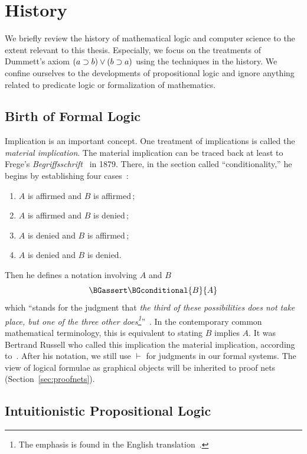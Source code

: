 \section{History}

We briefly review the history of mathematical logic and computer science
to the extent relevant to this thesis.
Especially, we focus on the treatments of Dummett's axiom $(a\supset
b)\lor(b\supset a)$ using the techniques in the history.
We confine ourselves to the developments of propositional logic and
ignore anything related to predicate logic or formalization of
mathematics.

\subsection{Birth of Formal Logic}

Implication is an important concept.
One treatment of implications is called the \textit{material
implication}.
The material implication can be traced back at least to
Frege's \textit{Begriffsschrift}~\citep{frege} in 1879.
There, in the
section called ``conditionality,''
he begins by establishing four cases~\citep[p.~13]{frege}:
\begin{enumerate}
 \item $A$ is affirmed and $B$ is affirmed\,;
 \item $A$ is affirmed and $B$ is denied\,;
 \item $A$ is denied and $B$ is affirmed\,;
 \item $A$ is denied and $B$ is denied.
\end{enumerate}
Then he defines a notation involving $A$ and $B$
\[
\BGassert\BGconditional{B}{A}
\]
which ``stands for the
judgment that \textit{the third of these possibilities does not take
place, but one of the three other does\footnote{The emphasis is found in
the English translation~\citep[p.~14]{frege}.}}''~\citep[p.~14]{frege}.
In the contemporary common mathematical terminology, this is equivalent
to stating $B$ implies $A$.
It was Bertrand Russell who called this implication the material
implication,
according to~\citet{sep-conditionals}.
After his notation, we still use $\vdash$ for judgments in our formal
systems.
The view of logical formulae as graphical objects
will be inherited to proof nets (Section~\ref{sec:proofnets}).

\subsection{Intuitionistic Propositional Logic}

